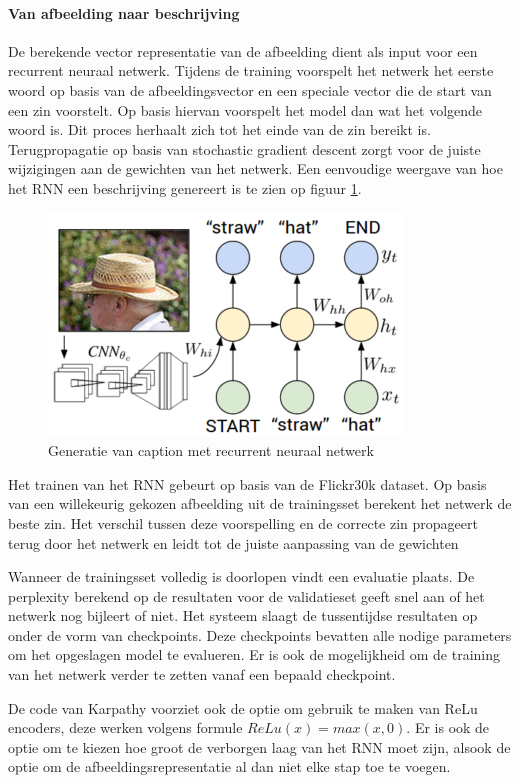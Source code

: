 \paragraph{Van afbeelding naar beschrijving}
De berekende vector representatie van de afbeelding dient als input voor een recurrent neuraal netwerk. Tijdens de training voorspelt het netwerk het eerste woord op basis van de afbeeldingsvector en een speciale vector die de start van een zin voorstelt. Op basis hiervan voorspelt het model dan wat het volgende woord is. Dit proces herhaalt zich tot het einde van de zin bereikt is. Terugpropagatie op basis van stochastic gradient descent zorgt voor de juiste wijzigingen aan de gewichten van het netwerk. Een eenvoudige weergave van hoe het RNN een beschrijving genereert is te zien op figuur \ref{fig:rnntraining}.

\begin{figure}[tb]
    \centering
    \includegraphics[width=0.5\linewidth]{Images/karpathy.PNG}
    \caption{Generatie van caption met recurrent neuraal netwerk}
\label{fig:rnntraining}
\end{figure}

Het trainen van het RNN gebeurt op basis van de Flickr30k dataset. 
Op basis van een willekeurig gekozen afbeelding uit de trainingsset berekent het netwerk de beste zin. Het verschil tussen deze voorspelling en de correcte zin propageert terug door het netwerk en leidt tot de juiste aanpassing van de gewichten

Wanneer de trainingsset volledig is doorlopen vindt een evaluatie plaats. De perplexity berekend op de resultaten voor de validatieset geeft snel aan of het netwerk nog bijleert of niet. Het systeem slaagt de tussentijdse resultaten op onder de vorm van checkpoints. Deze checkpoints bevatten alle nodige parameters om het opgeslagen model te evalueren. Er is ook de mogelijkheid om de training van het netwerk verder te zetten vanaf een bepaald checkpoint. 

De code van Karpathy voorziet ook de optie om gebruik te maken van ReLu encoders, deze werken volgens formule $ReLu(x) = max(x,0)$. Er is ook de optie om te kiezen hoe groot de verborgen laag van het RNN moet zijn, alsook de optie om de afbeeldingsrepresentatie al dan niet elke stap toe te voegen.

